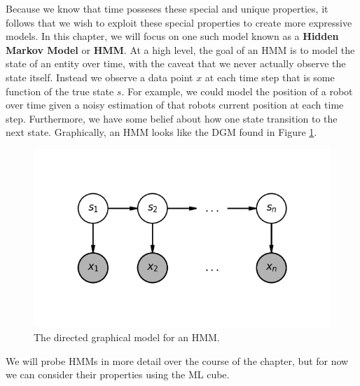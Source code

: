 Because we know that time posseses these special and unique properties, it follows that we wish to exploit these special properties to create more expressive models. In this chapter, we will focus on one such model known as a \textbf{Hidden Markov Model} or \textbf{HMM}. At a high level, the goal of an HMM is to model the state of an entity over time, with the caveat that we never actually observe the state itself. Instead we observe a data point $x$ at each time step that is some function of the true state $s$. For example, we could model the position of a robot over time given a noisy estimation of that robots current position at each time step. Furthermore, we have some belief about how one state transition to the next state. Graphically, an HMM looks like the DGM found in Figure \ref{fig:HMM-DGM}.

\begin{figure}
    \centering
    \includegraphics[width=0.5\paperwidth]{../HiddenMarkovModels/fig/HMM_DGM.png}
    \caption{The directed graphical model for an HMM.}
    \label{fig:HMM-DGM}
\end{figure}

We will probe HMMs in more detail over the course of the chapter, but for now we can consider their properties using the ML cube.

